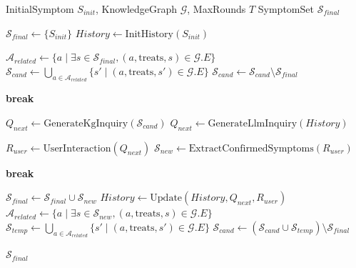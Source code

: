 \begin{algorithm}[h]
\caption{Graph-Driven Interactive Reverse Reasoning}
\label{alg:reverse_reasoning}
\begin{algorithmic}[1]
\Require InitialSymptom $S_{init}$, KnowledgeGraph $\mathcal{G}$, MaxRounds $T$
\Ensure SymptomSet $\mathcal{S}_{final}$

    \State $\mathcal{S}_{final} \leftarrow \{S_{init}\}$
    \State $History \leftarrow \text{InitHistory}(S_{init})$
    
    \State $\mathcal{A}_{related} \leftarrow \{a \mid \exists s \in \mathcal{S}_{final}, (a, \text{treats}, s) \in \mathcal{G}.E\}$
    \State $\mathcal{S}_{cand} \leftarrow \bigcup_{a \in \mathcal{A}_{related}} \{s' \mid (a, \text{treats}, s') \in \mathcal{G}.E\}$
    \State $\mathcal{S}_{cand} \leftarrow \mathcal{S}_{cand} \setminus \mathcal{S}_{final}$

            \State \textbf{break}
        \EndIf
        
            \State $Q_{next} \leftarrow \text{GenerateKgInquiry}(\mathcal{S}_{cand})$
        \Else
            \State $Q_{next} \leftarrow \text{GenerateLlmInquiry}(History)$
        \EndIf
        
        \State $R_{user} \leftarrow \text{UserInteraction}(Q_{next})$
        \State $\mathcal{S}_{new} \leftarrow \text{ExtractConfirmedSymptoms}(R_{user})$
        
            \State \textbf{break}
        \EndIf
        
        \State $\mathcal{S}_{final} \leftarrow \mathcal{S}_{final} \cup \mathcal{S}_{new}$
        \State $History \leftarrow \text{Update}(History, Q_{next}, R_{user})$
        \State $\mathcal{A}_{related} \leftarrow \{a \mid \exists s \in \mathcal{S}_{new}, (a, \text{treats}, s) \in \mathcal{G}.E\}$
        \State $\mathcal{S}_{temp} \leftarrow \bigcup_{a \in \mathcal{A}_{related}} \{s' \mid (a, \text{treats}, s') \in \mathcal{G}.E\}$
        \State $\mathcal{S}_{cand} \leftarrow (\mathcal{S}_{cand} \cup \mathcal{S}_{temp}) \setminus \mathcal{S}_{final}$
    \EndFor
    
    \State \Return $\mathcal{S}_{final}$
\EndFunction
\end{algorithmic}
\end{algorithm}